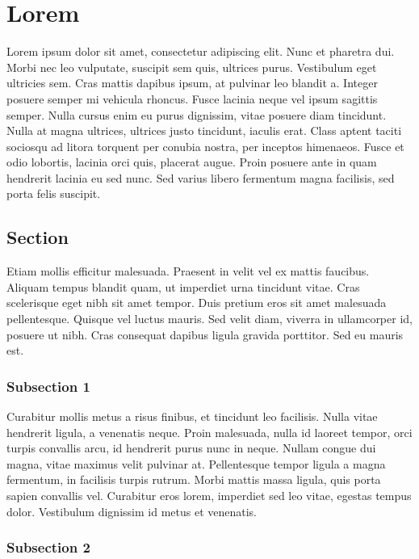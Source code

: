 \chapter{Lorem}

Lorem ipsum dolor sit amet, consectetur adipiscing elit. Nunc et pharetra dui. Morbi nec leo vulputate, suscipit sem quis, ultrices purus. Vestibulum eget ultricies sem. Cras mattis dapibus ipsum, at pulvinar leo blandit a. Integer posuere semper mi vehicula rhoncus. Fusce lacinia neque vel ipsum sagittis semper. Nulla cursus enim eu purus dignissim, vitae posuere diam tincidunt. Nulla at magna ultrices, ultrices justo tincidunt, iaculis erat. Class aptent taciti sociosqu ad litora torquent per conubia nostra, per inceptos himenaeos. Fusce et odio lobortis, lacinia orci quis, placerat augue. Proin posuere ante in quam hendrerit lacinia eu sed nunc. Sed varius libero fermentum magna facilisis, sed porta felis suscipit. \parencite{bratkova2008metody}

\section{Section}

Etiam mollis efficitur malesuada. Praesent in velit vel ex mattis faucibus. Aliquam tempus blandit quam, ut imperdiet urna tincidunt vitae. Cras scelerisque eget nibh sit amet tempor. Duis pretium eros sit amet malesuada pellentesque. Quisque vel luctus mauris. Sed velit diam, viverra in ullamcorper id, posuere ut nibh. Cras consequat dapibus ligula gravida porttitor. Sed eu mauris est.

\subsection{Subsection 1}

Curabitur mollis metus a risus finibus, et tincidunt leo facilisis. Nulla vitae hendrerit ligula, a venenatis neque. Proin malesuada, nulla id laoreet tempor, orci turpis convallis arcu, id hendrerit purus nunc in neque. Nullam congue dui magna, vitae maximus velit pulvinar at. Pellentesque tempor ligula a magna fermentum, in facilisis turpis rutrum. Morbi mattis massa ligula, quis porta sapien convallis vel. Curabitur eros lorem, imperdiet sed leo vitae, egestas tempus dolor. Vestibulum dignissim id metus et venenatis.

\subsection{Subsection 2}


